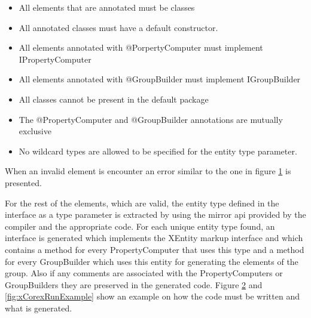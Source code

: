 	\begin{itemize}
	  \item All elements that are annotated must be classes
	  \item All annotated classes must have a default constructor.
	  \item All elements annotated with @PorpertyComputer must implement
 IPropertyComputer
 	  \item All elements annotated with @GroupBuilder must implement
 IGroupBuilder
 	  \item  All classes cannot be present in the default package
 	  \item  The @PropertyComputer and @GroupBuilder annotations are mutually
exclusive
	  \item  No wildcard types are allowed to be specified for the entity type
 parameter.
	\end{itemize}
	When an invalid element is encounter an error similar to the one in figure
\ref{fig:xCorexError} is presented.
\begin{figure}
\centering
{}
\label{fig:xCorexError}
\end{figure}
	For the rest of the elements, which are valid, the entity type defined in the
interface as a type parameter is extracted by using the mirror api provided by
the compiler and the appropriate code. For each unique entity type found, an
interface is generated which implements the XEntity markup interface and which
contains a method for every PropertyComputer that uses this type and a method
for every GroupBuilder which uses this entity for generating the elements of the
group. Also if any comments are associated with the PropertyComputers or
GroupBuilders they are preserved in the generated code. Figure
\ref{fig:xCorexCodeExample} and \ref{fig:xCorexRunExample} show an example on
how the code must be written and what is generated.

\begin{figure}
\centering
{}
\label{fig:xCorexCodeExample}
\end{figure}

